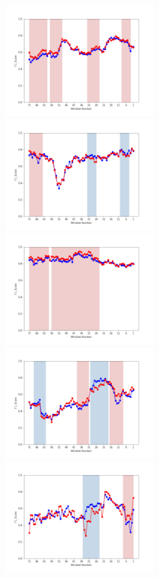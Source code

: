 \documentclass[submit]{ipsj}
\begin{document}
\begin{figure}[t]
\begin{center}
    \includegraphics[width=0.495\textwidth]{Uenaka_fig/RQ2_result/Nova/Nova_review_F1.pdf}
    \includegraphics[width=0.495\textwidth]{Uenaka_fig/RQ2_result/Neutron/Neutron_review_F1.pdf}
    \includegraphics[width=0.495\textwidth]{Uenaka_fig/RQ2_result/Cinder/Cinder_review_F1.pdf}
    \includegraphics[width=0.495\textwidth]{Uenaka_fig/RQ2_result/Keystone/Keystone_review_F1.pdf}
    \includegraphics[width=0.495\textwidth]{Uenaka_fig/RQ2_result/Swift/Swift_review_F1.pdf}

\end{center}
\end{figure}
\end{document}
